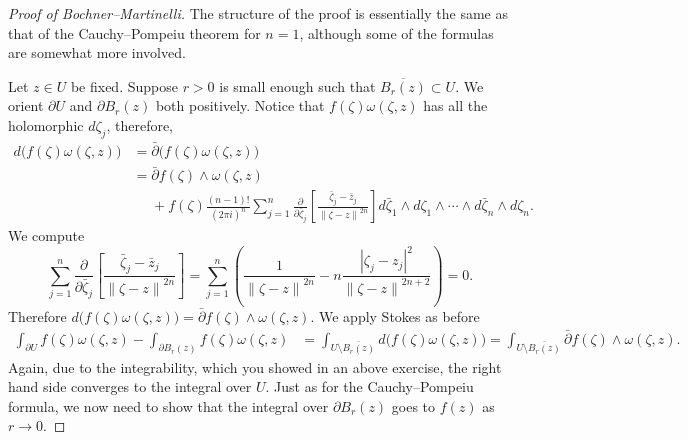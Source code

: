 \documentclass[12pt,openany]{book}
\newcommand{\abs}[1]{\left\lvert {#1} \right\rvert}
\newcommand{\norm}[1]{\left\lVert {#1} \right\rVert}
\theoremstyle{plain}
\theoremstyle{remark}
\theoremstyle{definition}
\theoremstyle{exercise}
\theoremstyle{example}
\begin{document}
\begin{proof}[Proof of Bochner--Martinelli]
The structure of the proof is essentially the same as that of
the Cauchy--Pompeiu theorem for $n=1$, although some of the formulas are somewhat
more involved.

Let $z \in U$ be fixed.  Suppose $r > 0$ is small enough such that
$\overline{B_r(z)} \subset U$.  We orient $\partial U$ and $\partial B_r(z)$
both positively.  Notice that 
$f(\zeta) \omega(\zeta,z)$ has all the holomorphic $d\zeta_j$, therefore,
\begin{equation*}
\begin{split}
d \bigl( f(\zeta) \omega(\zeta,z) \bigr)
& =
\bar{\partial} \bigl( f(\zeta) \omega(\zeta,z) \bigr)
\\
& = 
\bar{\partial} f(\zeta) \wedge \omega(\zeta,z)
\\
& \phantom{=} +
f(\zeta)
\frac{(n-1)!}{{(2\pi i)}^n}
\sum_{j=1}^n
\frac{\partial}{\partial \bar{\zeta}_j} \left[
\frac{\bar{\zeta}_j-\bar{z}_j}{\norm{\zeta-z}^{2n}}
\right]
d\bar{\zeta}_1 \wedge d\zeta_1 \wedge
\cdots \wedge
d\bar{\zeta}_n \wedge d\zeta_n .
\end{split}
\end{equation*}
We compute
\begin{equation*}
\sum_{j=1}^n
\frac{\partial}{\partial \bar{\zeta}_j}
\left[
\frac{\bar{\zeta}_j-\bar{z}_j}{\norm{\zeta-z}^{2n}}
\right]
=
\sum_{j=1}^n
\left(
\frac{1}{\norm{\zeta-z}^{2n}}
-n
\frac{\abs{\zeta_j-z_j}^2}{\norm{\zeta-z}^{2n+2}}
\right)
= 0 .
\end{equation*}
Therefore 
$d \bigl( f(\zeta) \omega(\zeta,z) \bigr) = \bar{\partial} f(\zeta) \wedge
\omega(\zeta,z)$.
We apply Stokes as before
\begin{equation*}
\begin{split}
\int_{\partial U}
f(\zeta) \omega(\zeta,z)
-
\int_{\partial B_r(z)}
f(\zeta) \omega(\zeta,z)
& =
\int_{U \setminus \overline{B_r(z)}}
d \bigl( f(\zeta) \omega(\zeta,z) \bigr)
=
\int_{U \setminus \overline{B_r(z)}}
\bar{\partial} f(\zeta) \wedge \omega(\zeta,z) .
\end{split}
\end{equation*}
Again, due to the integrability, which you showed in an above exercise,
the right hand side converges to the integral over $U$.
Just as for the Cauchy--Pompeiu formula, we now need to show that the integral
over $\partial B_r(z)$ goes to $f(z)$ as $r \to 0$.


\end{proof}
\end{document}
